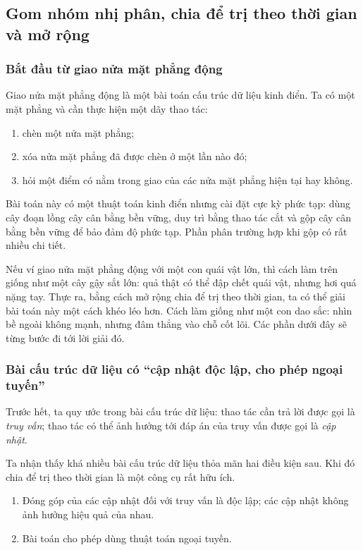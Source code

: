\documentclass[11pt]{article}
\begin{document}
\subsection{Gom nhóm nhị phân, chia để trị theo thời gian và mở rộng}

\subsubsection{Bắt đầu từ giao nửa mặt phẳng động}

Giao nửa mặt phẳng động là một bài toán cấu trúc dữ liệu kinh điển. Ta có
một mặt phẳng và cần thực hiện một dãy thao tác:
\begin{enumerate}
  \item chèn một nửa mặt phẳng;
  \item xóa nửa mặt phẳng đã được chèn ở một lần nào đó;
  \item hỏi một điểm có nằm trong giao của các nửa mặt phẳng hiện tại hay
  không.
\end{enumerate}

Bài toán này có một thuật toán kinh điển nhưng cài đặt cực kỳ phức tạp: dùng
cây đoạn lồng cây cân bằng bền vững, duy trì bằng thao tác cắt và gộp cây
cân bằng bền vững để bảo đảm độ phức tạp. Phần phân trường hợp khi gộp có
rất nhiều chi tiết.

Nếu ví giao nửa mặt phẳng động với một con quái vật lớn, thì cách làm trên
giống như một cây gậy sắt lớn: quả thật có thể đập chết quái vật, nhưng hơi
quá nặng tay. Thực ra, bằng cách mở rộng chia để trị theo thời gian, ta có
thể giải bài toán này một cách khéo léo hơn. Cách làm giống như một con dao
sắc: nhìn bề ngoài không mạnh, nhưng đâm thẳng vào chỗ cốt lõi. Các phần
dưới đây sẽ từng bước đi tới lời giải đó.

\subsubsection{Bài cấu trúc dữ liệu có ``cập nhật độc lập, cho phép ngoại
tuyến''}

Trước hết, ta quy ước trong bài cấu trúc dữ liệu: thao tác cần trả lời được
gọi là \emph{truy vấn}; thao tác có thể ảnh hưởng tới đáp án của truy vấn
được gọi là \emph{cập nhật}.

Ta nhận thấy khá nhiều bài cấu trúc dữ liệu thỏa mãn hai điều kiện sau. Khi
đó chia để trị theo thời gian là một công cụ rất hữu ích.
\begin{enumerate}
  \item Đóng góp của các cập nhật đối với truy vấn là độc lập; các cập nhật
  không ảnh hưởng hiệu quả của nhau.
  \item Bài toán cho phép dùng thuật toán ngoại tuyến.
\end{enumerate}
\end{document}
